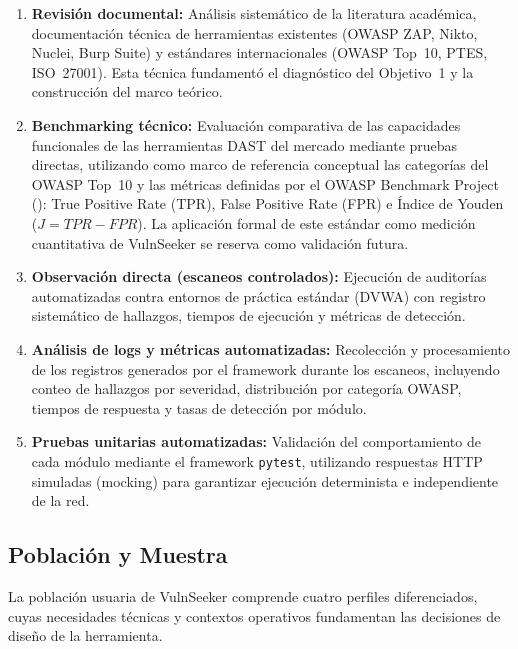 \documentclass[12pt, a4paper]{article}
\begin{document}
\begin{enumerate}
    \item \textbf{Revisión documental:} Análisis sistemático de la literatura
    académica, documentación técnica de herramientas existentes (OWASP ZAP,
    Nikto, Nuclei, Burp Suite) y estándares internacionales (OWASP Top~10,
    PTES, ISO~27001). Esta técnica fundamentó el diagnóstico del Objetivo~1
    y la construcción del marco teórico.

    \item \textbf{Benchmarking técnico:} Evaluación comparativa de las
    capacidades funcionales de las herramientas DAST del mercado mediante
    pruebas directas, utilizando como marco de referencia conceptual las
    categorías del OWASP Top~10 y las métricas definidas por el OWASP Benchmark
    Project (\cite{owaspbenchmark}): True Positive Rate (TPR), False
    Positive Rate (FPR) e Índice de Youden ($J = TPR - FPR$). La aplicación
    formal de este estándar como medición cuantitativa de VulnSeeker se reserva
    como validación futura.

    \item \textbf{Observación directa (escaneos controlados):} Ejecución
    de auditorías automatizadas contra entornos de práctica estándar (DVWA)
    con registro sistemático de hallazgos, tiempos de ejecución y métricas
    de detección.

    \item \textbf{Análisis de logs y métricas automatizadas:} Recolección
    y procesamiento de los registros generados por el framework durante los
    escaneos, incluyendo conteo de hallazgos por severidad, distribución por
    categoría OWASP, tiempos de respuesta y tasas de detección por módulo.

    \item \textbf{Pruebas unitarias automatizadas:} Validación del
    comportamiento de cada módulo mediante el framework \texttt{pytest},
    utilizando respuestas HTTP simuladas (mocking) para garantizar ejecución
    determinista e independiente de la red.
\end{enumerate}

\subsection{Población y Muestra}

La población usuaria de VulnSeeker comprende cuatro perfiles diferenciados,
cuyas necesidades técnicas y contextos operativos fundamentan las decisiones
de diseño de la herramienta.
\end{document}
